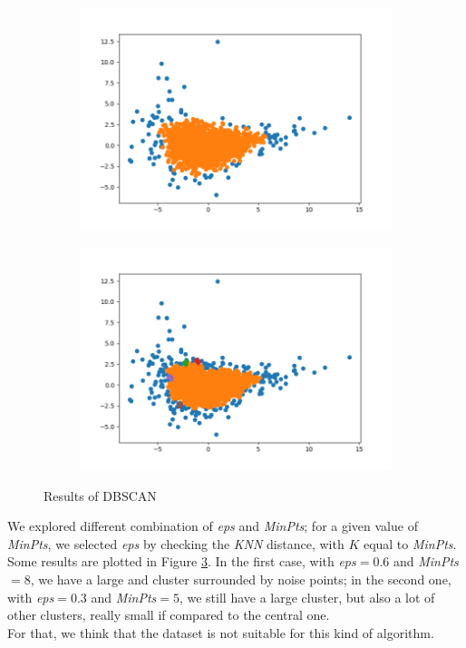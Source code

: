 \begin{figure}[h!]
	\captionsetup{justification=centering}
	\centering
	\begin{subfigure}{0.49\textwidth}
		\includegraphics[width=.65\textwidth]{img/clustering/dbscan.png}
		\centering
		\label{fig:dbscan_good}
	\end{subfigure}
	\begin{subfigure}{0.49\textwidth}
		\includegraphics[width=.65\textwidth]{img/clustering/dbscan_bad.png}
		\centering
		\label{fig:dbscan_bad}
	\end{subfigure}
	\caption{Results of DBSCAN}
	\label{fig:dbscan}
\end{figure}

We explored different combination of \emph{eps} and \emph{MinPts}; for a given value of \emph{MinPts}, we selected \emph{eps} by checking the \emph{KNN} distance, with $K$ equal to \emph{MinPts}.\\
Some results are plotted in Figure \ref{fig:dbscan}. In the first case, with \emph{eps}$= 0.6$ and \emph{MinPts}$=8$, we have a large and cluster surrounded by noise points; in the second one, with \emph{eps}$=0.3$ and \emph{MinPts}$=5$, we still have a large cluster, but also a lot of other clusters, really small if compared to the central one.\\
For that, we think that the dataset is not suitable for this kind of algorithm.
